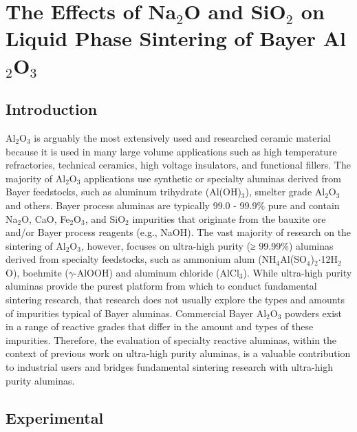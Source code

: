 \chapter{The Effects of Na$_{2}$O and SiO$_{2}$ on Liquid Phase Sintering of Bayer Al$_{2}$O$_{3}$}

\section{Introduction}
Al$_{2}$O$_{3}$ is arguably the most extensively used and researched ceramic material because it is used in many large volume applications such as high temperature refractories, technical ceramics, high voltage insulators, and functional fillers. The majority of Al$_{2}$O$_{3}$ applications use synthetic or specialty aluminas derived from Bayer feedstocks, such as aluminum trihydrate (Al(OH)$_{3}$), smelter grade Al$_{2}$O$_{3}$ and others. Bayer process aluminas are typically 99.0 - 99.9\% pure and contain Na$_{2}$O, CaO, Fe$_{2}$O$_{3}$, and SiO$_{2}$ impurities that originate from the bauxite ore and/or Bayer process reagents (e.g., NaOH). The vast majority of research on the sintering of Al$_{2}$O$_{3}$, however, focuses on ultra-high purity (≥ 99.99\%) aluminas derived from specialty feedstocks, such as ammonium alum (NH$_{4}$Al(SO$_{4}$)$_{2}$$\cdot$12H$_{2}$O), boehmite ($\gamma$-AlOOH) and aluminum chloride (AlCl$_{3}$). While ultra-high purity aluminas provide the purest platform from which to conduct fundamental sintering research, that research does not usually explore the types and amounts of impurities typical of Bayer aluminas.  Commercial Bayer Al$_{2}$O$_{3}$ powders exist in a range of reactive grades that differ in the amount and types of these impurities. Therefore, the evaluation of specialty reactive aluminas, within the context of previous work on ultra-high purity aluminas, is a valuable contribution to industrial users and bridges fundamental sintering research with ultra-high purity aluminas.


\section{Experimental}

